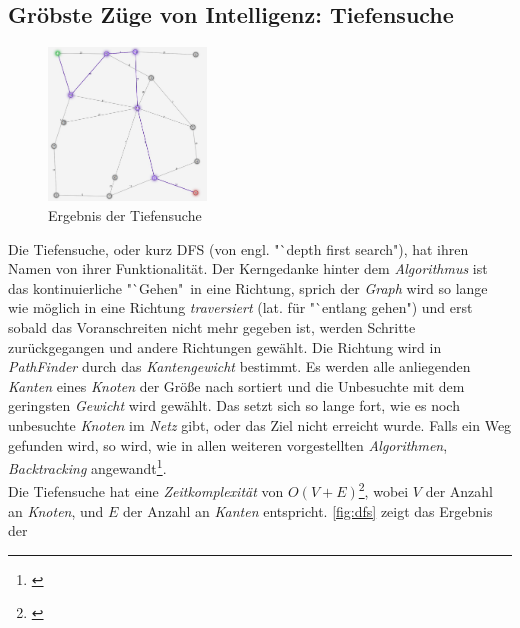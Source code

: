 \documentclass[12pt]{article}
\begin{document}
\subsection{Gröbste Züge von Intelligenz: Tiefensuche}
\begin{figure}
\vspace{-20pt}
\begin{center}
\includegraphics[width=0.375\textwidth]{res/dfs.png}
\end{center}
\vspace{-30pt}
\centering
\caption{Ergebnis der Tiefensuche}
\label{fig:dfs}
\end{figure}
Die Tiefensuche, oder kurz DFS (von engl. "`depth first search"), hat ihren Namen von ihrer Funktionalität. Der Kerngedanke hinter dem \textit{Algorithmus} ist das kontinuierliche "`Gehen"\ in eine Richtung, sprich der \textit{Graph} wird so lange wie möglich in eine Richtung \textit{traversiert} (lat. für "`entlang gehen") und erst sobald das Voranschreiten nicht mehr gegeben ist, werden Schritte zurückgegangen und andere Richtungen gewählt. Die Richtung wird in \textit{PathFinder} durch das \textit{Kantengewicht} bestimmt. Es werden alle anliegenden \textit{Kanten} eines \textit{Knoten} der Größe nach sortiert und die Unbesuchte mit dem geringsten \textit{Gewicht} wird gewählt. Das setzt sich so lange fort, wie es noch unbesuchte \textit{Knoten} im \textit{Netz} gibt, oder das Ziel nicht erreicht wurde. Falls ein Weg gefunden wird, so wird, wie in allen weiteren vorgestellten \textit{Algorithmen}, \textit{Backtracking} angewandt\footnote{\cite[Kapitel 22.3, S. 457f]{cormen}}. 
\\
Die Tiefensuche hat eine \textit{Zeitkomplexität} von $O(V + E)$\footnote{\cite[Kapitel 22.3, S. 459]{cormen}}, wobei $V$ der Anzahl an \textit{Knoten}, und $E$ der Anzahl an \textit{Kanten} entspricht. \autoref{fig:dfs} zeigt das Ergebnis der 
\end{document}
